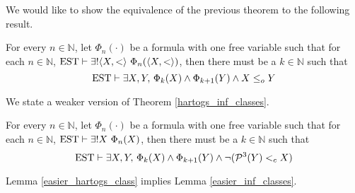 We would like to show the equivalence of the previous theorem to the following result.

\begin{lemma}
	\label{easier_hartogs_class}
	For every $n\in\mathbb{N}$, let $\Phi_n(\cdot)$ be a formula with one free variable such that for each $n\in\mathbb{N}$, $\operatorname{EST} \vdash \exists! \langle X, < \rangle \ \Phi_n ( \langle X,<\rangle)$, then there must be a $k \in \mathbb{N}$ such that 
	\[
		\operatorname{EST} \vdash \exists X,Y, \, \Phi_k (X) \land \Phi_{k+1} (Y) \land X \leq_o Y
	\]
\end{lemma}

We state a weaker version of Theorem \ref{hartogs_inf_classes}.

\begin{lemma}
	\label{easier_inf_classes}
	For every $n\in\mathbb{N}$, let $\Phi_n(\cdot)$ be a formula with one free variable such that for each $n\in\mathbb{N}$, $\operatorname{EST} \vdash \exists! X \ \Phi_n (X)$, then there must be a $k \in \mathbb{N}$ such that 
	\[
		\operatorname{EST} \vdash \exists X,Y ,\, \Phi_k (X) \land \Phi_{k+1} (Y) \land \neg(\mathcal{P}^{3}(Y) <_c X)
	\]
\end{lemma}

\begin{theorem}
	Lemma \ref{easier_hartogs_class} implies Lemma \ref{easier_inf_classes}.
\end{theorem}

